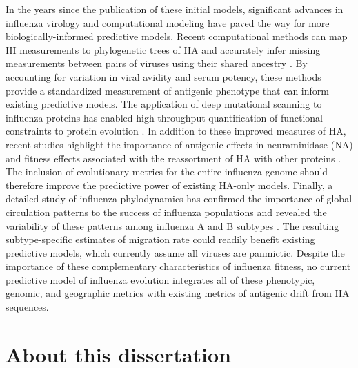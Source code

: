 In the years since the publication of these initial models, significant advances in influenza virology and computational modeling have paved the way for more biologically-informed predictive models.
Recent computational methods can map HI measurements to phylogenetic trees of HA and accurately infer missing measurements between pairs of viruses using their shared ancestry \citep{Neher:2016hy}.
By accounting for variation in viral avidity and serum potency, these methods provide a standardized measurement of antigenic phenotype that can inform existing predictive models.
The application of deep mutational scanning to influenza proteins has enabled high-throughput quantification of functional constraints to protein evolution \citep{Thyagarajan:2014go,Wu:2014ii,Doud:2016gm}.
In addition to these improved measures of HA, recent studies highlight the importance of antigenic effects in neuraminidase (NA) \citep{Chen:2018kp} and fitness effects associated with the reassortment of HA with other proteins \citep{Villa:2017iw}.
The inclusion of evolutionary metrics for the entire influenza genome should therefore improve the predictive power of existing HA-only models.
Finally, a detailed study of influenza phylodynamics has confirmed the importance of global circulation patterns to the success of influenza populations and revealed the variability of these patterns among influenza A and B subtypes \citep{Bedford:2015fj}.
The resulting subtype-specific estimates of migration rate could readily benefit existing predictive models, which currently assume all viruses are panmictic.
Despite the importance of these complementary characteristics of influenza fitness, no current predictive model of influenza evolution integrates all of these phenotypic, genomic, and geographic metrics with existing metrics of antigenic drift from HA sequences.

\section{About this dissertation}

